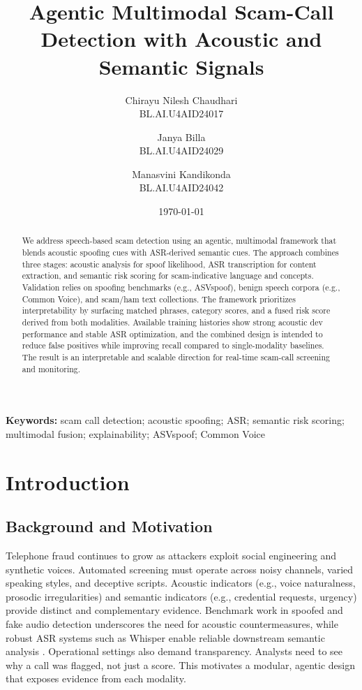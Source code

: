 \documentclass[11pt,a4paper]{article}
\title{Agentic Multimodal Scam-Call Detection with Acoustic and Semantic Signals}
\author{
Chirayu Nilesh Chaudhari\\
BL.AI.U4AID24017
\and
Janya Billa\\
BL.AI.U4AID24029
\and
Manasvini Kandikonda\\
BL.AI.U4AID24042
}
\date{\today}
\begin{document}
\maketitle

\begin{abstract}
We address speech-based scam detection using an agentic, multimodal framework that blends acoustic spoofing cues with ASR-derived semantic cues. The approach combines three stages: acoustic analysis for spoof likelihood, ASR transcription for content extraction, and semantic risk scoring for scam-indicative language and concepts. Validation relies on spoofing benchmarks (e.g., ASVspoof), benign speech corpora (e.g., Common Voice), and scam/ham text collections. The framework prioritizes interpretability by surfacing matched phrases, category scores, and a fused risk score derived from both modalities. Available training histories show strong acoustic dev performance and stable ASR optimization, and the combined design is intended to reduce false positives while improving recall compared to single-modality baselines. The result is an interpretable and scalable direction for real-time scam-call screening and monitoring.
\end{abstract}

\vspace{1em}
\noindent\textbf{Keywords:} scam call detection; acoustic spoofing; ASR; semantic risk scoring; multimodal fusion; explainability; ASVspoof; Common Voice

\section{Introduction}
\subsection{Background and Motivation}
Telephone fraud continues to grow as attackers exploit social engineering and synthetic voices. Automated screening must operate across noisy channels, varied speaking styles, and deceptive scripts. Acoustic indicators (e.g., voice naturalness, prosodic irregularities) and semantic indicators (e.g., credential requests, urgency) provide distinct and complementary evidence. Benchmark work in spoofed and fake audio detection underscores the need for acoustic countermeasures, while robust ASR systems such as Whisper enable reliable downstream semantic analysis \cite{asvspoof2019,whisper2022}.
Operational settings also demand transparency. Analysts need to see why a call was flagged, not just a score. This motivates a modular, agentic design that exposes evidence from each modality.
\end{document}
